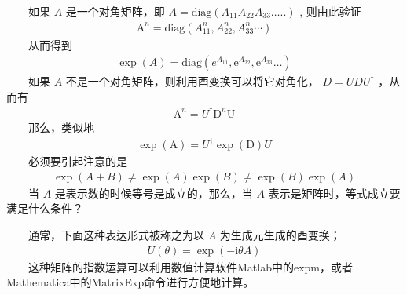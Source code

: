 \documentclass[a4paper,11pt,english]{sphinxmanual}
\begin{document}
\sphinxAtStartPar
  如果 \(A\) 是一个对角矩阵，即  \(A=\text{diag}\left(A_{11} A_{22} A_{33} \ldots . .\right)\) , 则由此验证
\begin{equation*}
\begin{split}\mathrm{A}^{n}=\text{diag}\left(A_{11}^{n}, A_{22}^{n}, A_{33}^{n} \cdots\right)\end{split}
\end{equation*}
\sphinxAtStartPar
  从而得到
\begin{equation*}
\begin{split}\exp (A)=\text{diag}\left(e^{A_{11}} ,\mathrm{e}^{A_{22}}, \mathrm{e}^{A_{33}} \ldots\right)\end{split}
\end{equation*}
\sphinxAtStartPar
  如果 \(A\) 不是一个对角矩阵，则利用酉变换可以将它对角化， \(D=U D U^{\dagger}\) ，从而有
\begin{equation*}
\begin{split}\mathrm{A}^{n}=U ^{\dagger} {\mathrm{D}^{n} \mathrm U}\end{split}
\end{equation*}
\sphinxAtStartPar
  那么，类似地
\begin{equation*}
\begin{split}\exp (\mathrm{A})=U ^{\dagger}\exp (\mathrm{D}) U\end{split}
\end{equation*}
\sphinxAtStartPar
  必须要引起注意的是
\begin{equation*}
\begin{split}\exp (A+B) \neq \exp (A) \exp (B) \neq \exp (B) \exp (A)\end{split}
\end{equation*}
\sphinxAtStartPar
  当 \(A\) 是表示数的时候等号是成立的，那么，当 \(A\) 表示是矩阵时，等式成立要满足什么条件？

\sphinxAtStartPar
  通常，下面这种表达形式被称之为以 \(A\) 为生成元生成的酉变换；
\begin{equation*}
\begin{split}U(\theta)=\exp (-\mathrm{i} \theta A)\end{split}
\end{equation*}
\sphinxAtStartPar
  这种矩阵的指数运算可以利用数值计算软件Matlab中的expm，或者Mathematica中的MatrixExp命令进行方便地计算。
\end{document}
